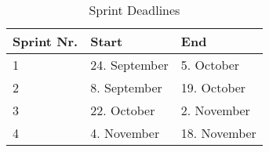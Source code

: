 \begin{table}
\caption{Sprint Deadlines}
\centering
\begin{tabular}{ l l l }
\hline
Sprint Nr.		&Start		&End		\\
\hline
1		&24. September		&5. October		\\
2		&8. September			&19. October		\\
3		&22. October			&2. November		\\
4		&4. November			&18. November	\\
\hline
\end{tabular}
\label{table:sprintdeadlines}
\end{table}
